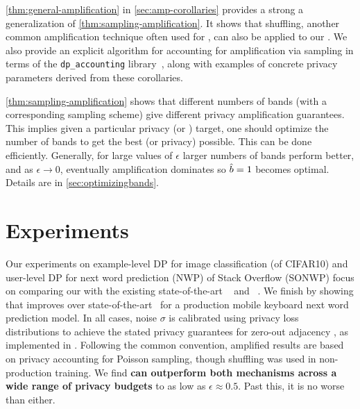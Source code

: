 \documentclass{article}
\begin{document}
 \cref{thm:general-amplification} in \cref{sec:amp-corollaries} provides a strong a generalization of \cref{thm:sampling-amplification}. It shows that shuffling, another common amplification technique often used for \dpsgd, can also be applied to our \BANDMF.  We also provide an explicit algorithm for accounting for amplification via sampling in terms of the
\texttt{dp\_accounting} library~\citep{pldlib}, along with examples of concrete privacy parameters derived from these corollaries.

\cref{thm:sampling-amplification} shows that different numbers of bands (with a corresponding sampling scheme) give different privacy amplification guarantees. This implies given a particular privacy (or \rmse) target, one should optimize the number of bands to get the best \rmse (or privacy) possible. This can be done efficiently. Generally, for large values of $\epsilon$ larger numbers of bands perform better, and as $\epsilon \rightarrow 0$, eventually amplification dominates so $\hat{b}=1$ becomes optimal. Details are in \cref{sec:optimizingbands}.

%
\section{Experiments}\label{sec:experiments}
Our experiments on example-level DP for image classification (of CIFAR10) and user-level DP for next word prediction (NWP) of Stack Overflow (SONWP) focus on comparing our \BANDMF with the existing state-of-the-art \memf~\cite{choquette2022multi} and \dpsgd~\cite{DP-DL}. 
We finish by showing that \BANDMF improves over state-of-the-art~\cite{kairouz2021practical} for a production mobile keyboard next word prediction model. %
In all cases, noise $\sigma$ is calibrated using privacy loss distributions \cite{koskela2020tight} to achieve the stated privacy guarantees for zero-out adjacency \citep{kairouz2021practical,ponomareva2023dpfy}, as implemented in \citep{pldlib}. Following the common convention, amplified results are based on privacy accounting for Poisson sampling, though shuffling was used in non-production training. We find \textbf{\BANDMF can outperform both mechanisms across a wide range of privacy budgets} to as low as $\epsilon\approx0.5$. Past this, it is no worse than either.
\end{document}
